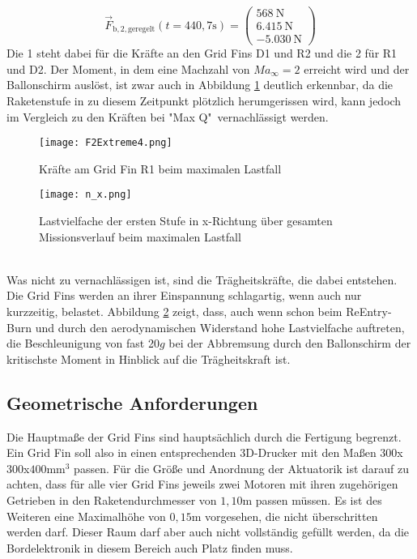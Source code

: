 \begin{equation}\label{eq_Fmax2}
\vec{F}_\mathrm{b, 2, geregelt}(t=440,7\mathrm{s})
=\left(\begin{array}{r}568\mathrm{\ N}\\6.415\mathrm{\ N}\\-5.030\mathrm{\ N}\end{array}\right)
\end{equation}
Die 1 steht dabei für die Kräfte an den Grid Fins D1 und R2 und die 2 für R1 und D2.
Der Moment, in dem eine Machzahl von $Ma_\infty = 2$ erreicht wird und der Ballonschirm auslöst, ist zwar auch in Abbildung \ref{abb_FExtreme} deutlich erkennbar, da die Raketenstufe in zu diesem Zeitpunkt plötzlich herumgerissen wird, kann jedoch im Vergleich zu den Kräften bei "Max Q"\ vernachlässigt werden.
\begin{figure}[h] 
	\centering
	\texttt{[image: F2Extreme4.png]}
	\caption{Kräfte am Grid Fin R1 beim maximalen Lastfall}
	\label{abb_FExtreme}
\end{figure}
\begin{figure}[h] 
\centering
\texttt{[image: n\_x.png]}
\caption{Lastvielfache der ersten Stufe in x-Richtung über gesamten Missionsverlauf beim maximalen Lastfall}
\label{abb_n_x}
\end{figure}\\
Was nicht zu vernachlässigen ist, sind die Trägheitskräfte, die dabei entstehen. Die Grid Fins werden an ihrer Einspannung schlagartig, wenn auch nur kurzzeitig, belastet. Abbildung \ref{abb_n_x} zeigt, dass, auch wenn schon beim ReEntry-Burn und durch den aerodynamischen Widerstand hohe Lastvielfache auftreten, die Beschleunigung von fast 20$g$ bei der Abbremsung durch den Ballonschirm der kritischste Moment in Hinblick auf die Trägheitskraft ist.
\subsection{Geometrische Anforderungen}
Die Hauptmaße der Grid Fins sind hauptsächlich durch die Fertigung begrenzt. Ein Grid Fin soll also in einen entsprechenden 3D-Drucker mit den Maßen $300$x$300$x$400\mathrm{mm}^3$ passen. Für die Größe und Anordnung der Aktuatorik ist darauf zu achten, dass für alle vier Grid Fins jeweils zwei Motoren mit ihren zugehörigen Getrieben in den Raketendurchmesser von $1,10$m passen müssen. Es ist des Weiteren eine Maximalhöhe von $0,15$m vorgesehen, die nicht überschritten werden darf. Dieser Raum darf aber auch nicht vollständig gefüllt werden, da die Bordelektronik in diesem Bereich auch Platz finden muss.
